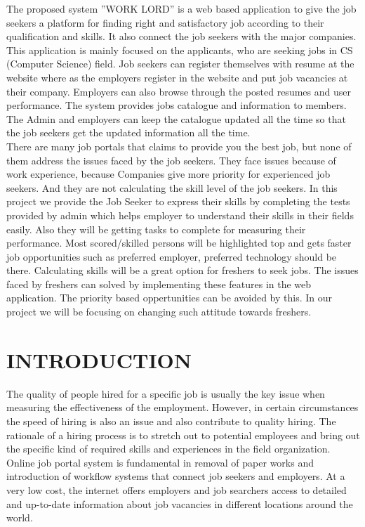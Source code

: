 \documentclass[a4paper,12pt]{report}
\begin{document}
The proposed system ”WORK LORD” is a web based application to give the
job seekers a platform for finding right and satisfactory job according to their qualification and skills. It also connect the job seekers with the major companies. This application is mainly focused on the applicants, who are seeking jobs in CS (Computer
Science) field. Job seekers can register themselves with resume at the website where as the
employers register in the website and put job vacancies at their
company. Employers can also browse through the posted resumes and user performance. The system provides jobs catalogue and information to members. The Admin and employers can
keep the catalogue updated all the time so that the job seekers get the updated information all the time.\\

There are many job portals that claims to provide you the best job, but none
of them address the issues faced by the job seekers. They face issues because of work experience, because Companies give more priority for experienced job seekers. And they are not calculating the skill level of the job seekers. In this project we provide the Job Seeker to express their skills by completing the tests provided by admin which helps employer to understand their skills in their fields easily. Also they will
be getting tasks to complete for measuring their performance. Most
scored/skilled persons will be highlighted top and gets faster job opportunities such as preferred employer, preferred technology should be there. Calculating skills will be a great option for freshers to seek jobs. The issues faced by freshers can solved by implementing these features in the web application. The priority based oppertunities can be avoided by this. In our project we will be focusing on changing
such attitude towards freshers.\\


\pagebreak

\chapter{INTRODUCTION}

\hspace*{12pt}The quality of people hired for a specific job is usually the key issue when measuring the effectiveness of the employment. However, in certain circumstances the speed of hiring is also an issue and also contribute to quality hiring. The rationale of a hiring process is to stretch out to potential employees and bring out the specific kind of required skills and experiences in the field organization. Online job portal system is fundamental in removal of paper works and introduction of workflow systems that connect job seekers and employers. At a very low cost, the internet offers employers and job searchers access to detailed and up-to-date information about job vacancies in different locations around the world. \\
\end{document}
